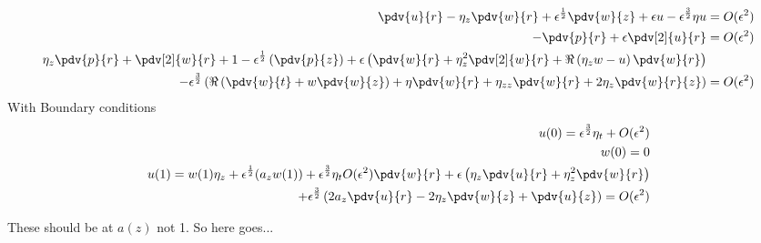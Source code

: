 \documentclass[12pt]{article}
\newcommand{\rt}{^{\frac{1}{2}}}
\newcommand{\rtt}{^{\frac{3}{2}}}
\begin{document}
\begin{align}
\pdv{u}{r}-\eta_z\pdv{w}{r} +\epsilon\rt\pdv{w}{z}+\epsilon u -\epsilon\rtt\eta u &= O(\epsilon^2)\\
-\pdv{p}{r}+\epsilon\pdv[2]{u}{r} & = O(\epsilon^2)\\
\eta_z\pdv{p}{r}+\pdv[2]{w}{r} + 1 -\epsilon\rt\left(\pdv{p}{z}\right)+\epsilon\left(\pdv{w}{r}+\eta_z^2\pdv[2]{w}{r}+\Re\left(\eta_z w-u\right)\pdv{w}{r}\right)&\\
-\epsilon\rtt\left(\Re\left(\pdv{w}{t}+w\pdv{w}{z}\right)+\eta\pdv{w}{r}+\eta_{zz}\pdv{w}{r}+2\eta_z\pdv{w}{r}{z}\right)& = O(\epsilon^2)
\end{align}
	With Boundary conditions 
	\begin{align}
	u(0) = \epsilon\rtt\eta_t +O(\epsilon^2)\\
	w(0) = 0 \\
	u(1) =w(1)\eta_z +\epsilon\rt(a_z w(1)) +\epsilon\rtt\eta_t O(\epsilon^2)
	\pdv{w}{r}+\epsilon\left(\eta_z\pdv{u}{r}+\eta_z^2\pdv{w}{r}\right)\\+\epsilon\rtt\left(2a_z\pdv{u}{r}-2\eta_z\pdv{w}{z}+\pdv{u}{z}\right)=O(\epsilon^2)
	\end{align}
	
	These should be at $a(z)$ not 1. So here goes...
\end{document}
